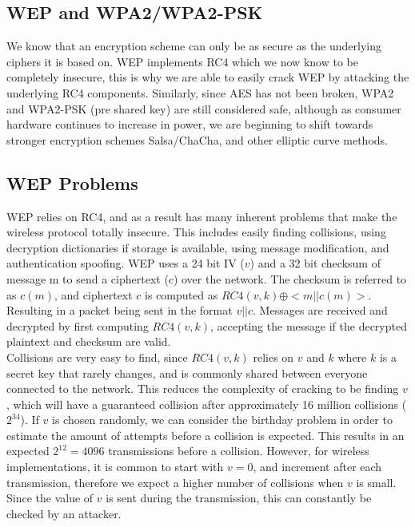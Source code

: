 \documentclass[10pt, titlepage]{article}
\begin{document}
\subsection{WEP and WPA2/WPA2-PSK}
We know that an encryption scheme can only be as secure as the underlying ciphers it is based on. WEP implements RC4 which we now know to be completely insecure, this is why we are able to easily crack WEP by attacking the underlying RC4 components. Similarly, since AES has not been broken, WPA2 and WPA2-PSK (pre shared key) are still considered safe, although as consumer hardware continues to increase in power,  we are beginning to shift towards stronger encryption schemes Salsa/ChaCha, and other elliptic curve methods. \\

\subsection{WEP Problems}
WEP relies on RC4, and as a result has many inherent problems that make the wireless protocol totally insecure. This includes easily finding collisions, using decryption dictionaries if storage is available, using message modification,  and authentication spoofing. WEP uses a 24 bit IV ($v$) and a 32 bit checksum of message m to send a ciphertext ($c$) over the network. The checksum is referred to as $c(m)$, and ciphertext $c$ is computed as $RC4(v,k) \oplus <m || c(m)>$. Resulting in a packet being sent in the format $v || c$. Messages are received and decrypted by first computing $RC4(v,k)$, accepting the message if the decrypted plaintext and checksum are valid. \\

Collisions are very easy to find, since $RC4(v,k)$ relies on $v$ and $k$ where $k$ is a secret key that rarely changes, and is commonly shared between everyone connected to the network. This reduces the complexity of cracking to be finding $v$, which will have a guaranteed collision after approximately 16 million collisions ($2^{34}$). If $v$ is chosen randomly, we can consider the birthday problem in order to estimate the amount of attempts before a collision is expected. This results in an expected $2^{12} = 4096$ transmissions before a collision. However, for wireless implementations, it is common to start with $v= 0$, and increment after each transmission, therefore we expect a higher number of collisions when $v$ is small. Since the value of $v$ is sent during the transmission, this can constantly be checked by an attacker. \\
\end{document}
